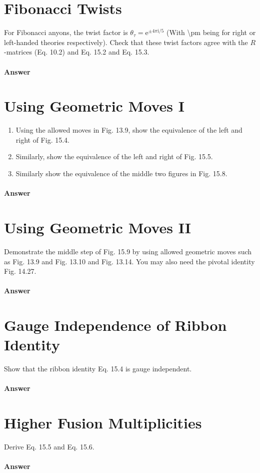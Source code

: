 

\section{Fibonacci Twists}
For Fibonacci anyons, the twist factor is $\theta _{\tau } =\mathrm{e}^{\pm 4\pi \mathrm{i} /5}$ (With \textbackslash pm being for right or left-handed theories respectively). Check that these twist factors agree with the $R$-matrices (Eq. 10.2) and Eq. 15.2 and Eq. 15.3.

\paragraph{Answer}

\section{Using Geometric Moves I}
\begin{enumerate}
\item Using the allowed moves in Fig. 13.9, show the equivalence of the left and right of Fig. 15.4. 
\item Similarly, show the equivalence of the left and right of Fig. 15.5. 
\item Similarly show the equivalence of the middle two figures in Fig. 15.8.
\end{enumerate}

\paragraph{Answer}

\section{Using Geometric Moves II}
Demonstrate the middle step of Fig. 15.9 by using allowed geometric moves such as Fig. 13.9 and Fig. 13.10 and Fig. 13.14. You may also need the pivotal identity Fig. 14.27.

\paragraph{Answer}

\section{Gauge Independence of Ribbon Identity}
Show that the ribbon identity Eq. 15.4 is gauge independent.

\paragraph{Answer}

\section{Higher Fusion Multiplicities}
Derive Eq. 15.5 and Eq. 15.6.

\paragraph{Answer}


